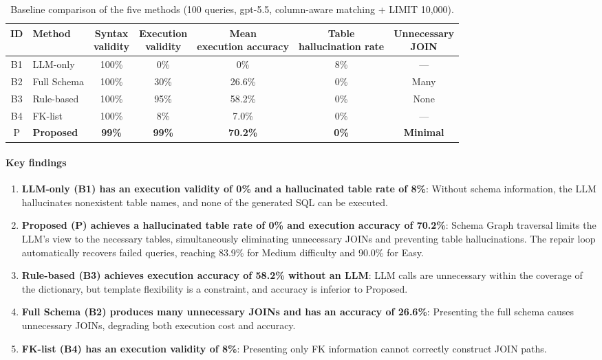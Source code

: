 \documentclass[5p,twocolumn]{elsarticle}
\begin{document}
\begin{table}[htbp]
  \centering
  \caption{Baseline comparison of the five methods (100 queries, gpt-5.5, column-aware matching + LIMIT 10{,}000).}
  \label{tab:baseline_results}
  \small
  \begin{tabular}{clccccc}
    \toprule
    ID & Method & \shortstack{Syntax\\validity} & \shortstack{Execution\\validity} & \shortstack{Mean\\execution accuracy} & \shortstack{Table\\hallucination rate} & \shortstack{Unnecessary\\ JOIN} \\
    \midrule
    B1 & LLM-only & 100\% & 0\% & 0\% & 8\% & --- \\
    B2 & Full Schema & 100\% & 30\% & 26.6\% & 0\% & Many \\
    B3 & Rule-based & 100\% & 95\% & 58.2\% & 0\% & None \\
    B4 & FK-list & 100\% & 8\% & 7.0\% & 0\% & --- \\
    P & \textbf{Proposed} & \textbf{99\%} & \textbf{99\%} & \textbf{70.2\%} & \textbf{0\%} & \textbf{Minimal} \\
    \bottomrule
  \end{tabular}
\end{table}

\paragraph{Key findings}

\begin{enumerate}
  \item \textbf{LLM-only (B1) has an execution validity of 0\% and a hallucinated table rate of 8\%}:
    Without schema information, the LLM hallucinates nonexistent table names,
    and none of the generated SQL can be executed.
  \item \textbf{Proposed (P) achieves a hallucinated table rate of 0\% and execution accuracy of 70.2\%}:
    Schema Graph traversal limits the LLM's view to the necessary tables,
    simultaneously eliminating unnecessary JOINs and preventing table hallucinations.
    The repair loop automatically recovers failed queries,
    reaching 83.9\% for Medium difficulty and 90.0\% for Easy.
  \item \textbf{Rule-based (B3) achieves execution accuracy of 58.2\% without an LLM}:
    LLM calls are unnecessary within the coverage of the dictionary,
    but template flexibility is a constraint, and accuracy is inferior to Proposed.
  \item \textbf{Full Schema (B2) produces many unnecessary JOINs and has an accuracy of 26.6\%}:
    Presenting the full schema causes unnecessary JOINs, degrading both execution cost and accuracy.
  \item \textbf{FK-list (B4) has an execution validity of 8\%}:
    Presenting only FK information cannot correctly construct JOIN paths.
\end{enumerate}
\end{document}
